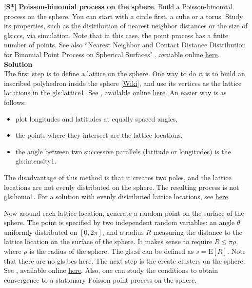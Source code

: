 \documentclass[10pt]{article}
\begin{document}
\begin{Exercise}\label{sphere90}
{\bf [S*]}  {\bf Poisson-binomial process on the sphere}.  Build a Poisson-binomial process on the sphere. You can start with a circle first, a cube or a torus. Study its properties, such as the distribution of \textcolor{index}{nearest neighbor distances} or the size of \glspl{gls:cc}, via simulation. Note that in this case, the point process has a finite number of points.
See also ``Nearest Neighbor and Contact Distance Distribution for Binomial Point Process on Spherical Surfaces" \cite{sphere}, avaiable
online \href{https://arxiv.org/abs/2005.07330}{here}. \vspace{1ex} \\
{\bf Solution} \vspace{1ex} \\
The first step is to define a lattice on the sphere. One way to do it is to build an inscribed polyhedron inside the sphere [\href{https://mathworld.wolfram.com/Circumsphere.html}{Wiki}], and use its \textcolor{index}{vertices} as the lattice locations in the \gls{gls:lattice1}. See \cite{physicj}, available online \href{https://iopscience.iop.org/article/10.1088/1742-6596/1581/1/012054}{here}.
An easier way is as follows:
\begin{itemize}
\item plot longitudes and latitudes at equally spaced angles,
\item the points where they intersect are the lattice locations,
\item the angle between two successive parallels (latitude or longitudes) is the \gls{gls:intensity1}.
\end{itemize}
The disadvantage of this method is that  it creates two poles, and the lattice locations are not evenly distributed on the sphere. The resulting process is not
 \gls{gls:homo1}. For a solution with evenly distributed lattice locations, see \href{https://www.maths.unsw.edu.au/about/distributing-points-sphere}{here}.

Now around each lattice location, generate a random point on the surface of the sphere. The point is specified by two independent random variables: an angle $\theta$ uniformly distributed
on $[0,2\pi]$, and a radius $R$ measuring the distance to the lattice location on the surface of the sphere. It makes sense to require $R\leq \pi\rho$, where $\rho$ is
the radius of the sphere. The \gls{gls:sf} can be defined as $s=\mbox{E}[R]$. Note that there are no \glspl{gls:be} here. The next step  is the create \textcolor{index}{clusters on the sphere}. See \cite{sphere343}, available online \href{https://bit.ly/3utjJOm}{here}. Also, one can  study the conditions to obtain convergence to
a stationary Poisson point process on the sphere.


\end{Exercise}
\end{document}
